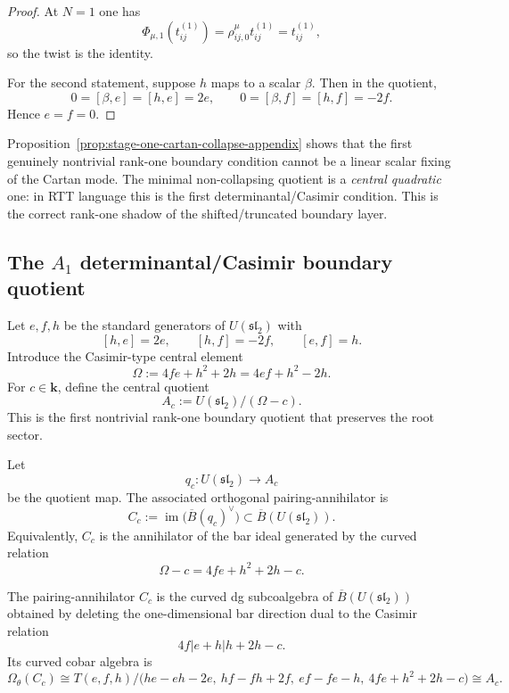 \begin{proof}
At $N=1$ one has
\[
\Phi_{\mu,1}(t_{ij}^{(1)})=\rho_{ij,0}^\mu t_{ij}^{(1)}=t_{ij}^{(1)},
\]
so the twist is the identity.

For the second statement, suppose $h$ maps to a scalar $\beta$. Then in the
quotient,
\[
0=[\beta,e]=[h,e]=2e,
\qquad
0=[\beta,f]=[h,f]=-2f.
\]
Hence $e=f=0$.
\end{proof}

\begin{remark}
\label{rem:first-non-collapsing-boundary-quotient}
Proposition~\ref{prop:stage-one-cartan-collapse-appendix} shows that the first genuinely
nontrivial rank-one boundary condition cannot be a linear scalar fixing of the
Cartan mode. The minimal non-collapsing quotient is a \emph{central quadratic}
one: in RTT language this is the first determinantal/Casimir condition. This
is the correct rank-one shadow of the shifted/truncated boundary layer.
\end{remark}

\subsection{The $A_1$ determinantal/Casimir boundary quotient}

Let $e,f,h$ be the standard generators of $U(\mathfrak{sl}_2)$ with
\[
[h,e]=2e,
\qquad
[h,f]=-2f,
\qquad
[e,f]=h.
\]
Introduce the Casimir-type central element
\[
\Omega:=4fe+h^2+2h=4ef+h^2-2h.
\]
For $c\in\mathbf{k}$, define the central quotient
\[
A_c:=U(\mathfrak{sl}_2)/(\Omega-c).
\]
This is the first nontrivial rank-one boundary quotient that preserves the root
sector.

\begin{definition}
\label{def:rank-one-orthogonal-coideal}
Let
\[
q_c\colon U(\mathfrak{sl}_2)\to A_c
\]
be the quotient map. The associated orthogonal pairing-annihilator is
\[
C_c:=\operatorname{im}\bigl(\overline{B}(q_c)^\vee\bigr)
\subset \overline{B}(U(\mathfrak{sl}_2)).
\]
Equivalently, $C_c$ is the annihilator of the bar ideal generated by the curved
relation
\[
\Omega-c=4fe+h^2+2h-c.
\]
\end{definition}

\begin{theorem}
\label{thm:explicit-rank-one-orthogonal-coideal}
The pairing-annihilator $C_c$ is the curved dg subcoalgebra of
$\overline{B}(U(\mathfrak{sl}_2))$ obtained by deleting the one-dimensional bar
direction dual to the Casimir relation
\[
4f|e+h|h+2h-c.
\]
Its curved cobar algebra is
\[
\Omega_\theta(C_c)
\cong
T(e,f,h)\Big/\bigl(he-eh-2e,\ hf-fh+2f,\ ef-fe-h,\ 4fe+h^2+2h-c\bigr)
\cong A_c.
\]
\end{theorem}

